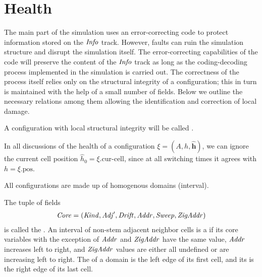\documentclass[11pt]{memoir}
\theoremstyle{definition} %
\renewcommand{\vek}[1]{\mathbf{#1}}
\newcommand{\fld}[1]{\ensuremath{\textit{#1\/}}}
\newcommand{\h}{h}
\newcommand{\hc}{\hat h}
\newcommand{\vhc}{\vek{\hat h}}
\newcommand{\pos}{\mathrm{pos}}
\newcommand{\curcell}{\textrm{cur-cell}}
\newcommand{\Addr}{\fld{Addr}}
\newcommand{\Core}{\fld{Core}}
\newcommand{\Drift}{\fld{Drift}}
\newcommand{\Adj}{\fld{Adj}}
\newcommand{\Info}{\fld{Info}}
\newcommand{\Kind}{\fld{Kind}}
\newcommand{\Sweep}{\fld{Sweep}}
\newcommand{\ZigAddr}{\fld{ZigAddr}}
\begin{document}
\section{Health}            \label{sec:health}

The main part of the simulation uses an error-correcting
code to protect information stored on the \( \Info \) track.
However, faults can ruin the simulation structure and disrupt the simulation itself.
The error-correcting capabilities of the code 
will preserve the content of the \( \Info \) track as long as the coding-decoding
process implemented in the simulation is carried out.
The correctness of the process itself relies only on
the structural integrity of a configuration; this in turn is maintained with the help of a small number
of fields.
Below we outline the necessary relations among them 
allowing the identification and correction of local damage.

A configuration with local structural integrity will be called .
\begin{sloppypar}
\begin{remark}
In all discussions of the health of a configuration \( \xi=(A,\h,\vhc) \), we can ignore
the current cell position \( \hc_{0}=\xi.\curcell \), since at all switching times 
it agrees with \( \h=\xi.\pos \).
\end{remark}
\end{sloppypar}

All configurations are made up of homogenous domains (interval).

\begin{definition}\label{def:domains}
The tuple of fields
\begin{align*}
   \Core =(\Kind,\Adj',\Drift,\Addr,\Sweep,\ZigAddr)
 \end{align*}
is called the .   
 An interval of non-stem adjacent neighbor cells is a  if
 its core variables with the exception of \( \Addr \) and \( \ZigAddr \) have the same value,
 \( \Addr \) increases left to right, and \( \ZigAddr \) values are either
 all undefined or are increasing left to right.
The  of a domain is the left edge of its first cell, and its  is 
the right edge of its last cell.
\end{definition}
\end{document}
